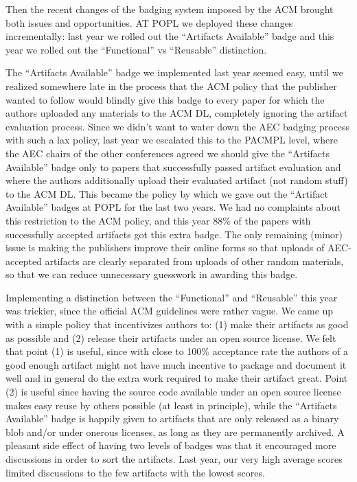 Then the recent changes of the badging system imposed by the ACM
brought both issues and opportunities. AT POPL we deployed these
changes incrementally: last year we rolled out the “Artifacts
Available” badge and this year we rolled out the “Functional” vs
“Reusable” distinction.

The “Artifacts Available” badge we implemented last year seemed easy,
until we realized somewhere late in the process that the ACM policy
that the publisher wanted to follow would blindly give this badge to
every paper for which the authors uploaded any materials to the ACM
DL, completely ignoring the artifact evaluation process. Since we
didn’t want to water down the AEC badging process with such a lax
policy, last year we escalated this to the PACMPL level, where the AEC
chairs of the other conferences agreed we should give the “Artifacts
Available” badge only to papers that successfully passed artifact
evaluation and where the authors additionally upload their evaluated
artifact (not random stuff) to the ACM DL. This became the policy by
which we gave out the “Artifact Available” badges at POPL for the last
two years. We had no complaints about this restriction to the ACM
policy, and this year 88\% of the papers with successfully accepted
artifacts got this extra badge. The only remaining (minor) issue is
making the publishers improve their online forms so that uploads of
AEC-accepted artifacts are clearly separated from uploads of other
random materials, so that we can reduce unnecessary guesswork in
awarding this badge.

Implementing a distinction between the “Functional” and “Reusable”
this year was trickier, since the official ACM guidelines were rather
vague. We came up with a simple policy that incentivizes authors to:
(1) make their artifacts as good as possible and (2) release their
artifacts under an open source license. We felt that point (1) is
useful, since with close to 100\% acceptance rate the authors of a
good enough artifact might not have much incentive to package and
document it well and in general do the extra work required to make
their artifact great. Point (2) is useful since having the source code
available under an open source license makes easy reuse by others
possible (at least in principle), while the “Artifacts Available”
badge is happily given to artifacts that are only released as a binary
blob and/or under onerous licenses, as long as they are permanently
archived. A pleasant side effect of having two levels of badges was
that it encouraged more discussions in order to sort the
artifacts. Last year, our very high average scores limited discussions
to the few artifacts with the lowest scores.


